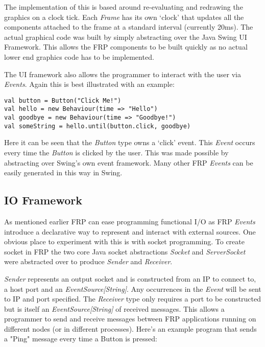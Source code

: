 \documentclass[12pt]{article}
\begin{document}
      The implementation of this is based around re-evaluating and redrawing the graphics on a clock tick. Each 
      \emph{Frame} has its own `clock' that updates all the components attached to the frame at a standard interval (currently 
      20ms). The actual graphical code was built by simply abstracting over the Java Swing UI Framework. This allows the FRP 
      components to be built quickly as no actual lower end graphics code has to be implemented.

      The UI framework also allows the programmer to interact with the user via \emph{Events}. Again this is best illustrated 
      with an example:

\begin{verbatim}
val button = Button("Click Me!") 
val hello = new Behaviour(time => "Hello")
val goodbye = new Behaviour(time => "Goodbye!")
val someString = hello.until(button.click, goodbye) 
\end{verbatim}

      Here it can be seen that the \emph{Button} type owns a `click' event. This \emph{Event} occurs every time the 
      \emph{Button} is clicked by the user. This was made possible by abstracting over Swing's own event framework. Many other 
      FRP \emph{Events} can be easily generated in this way in Swing.
    
    \subsection{IO Framework}
    
    As mentioned earlier FRP can ease programming functional I/O as FRP \emph{Events} introduce a declarative way to represent 
    and interact with external sources. One obvious place to experiment with this is with socket programming. To create socket 
    in FRP the two core Java socket abstractions \emph{Socket} and \emph{ServerSocket} were abstracted over to produce
    \emph{Sender} and \emph{Receiver}. 

    \emph{Sender} represents an output socket and is constructed from an IP to connect to, a host port and an 
    \emph{EventSource[String]}. Any occurrences in the \emph{Event} will be sent to IP and port specified. The \emph{Receiver} 
    type only requires a port to be constructed but is itself an \emph{EventSource[String]} of received messages. This allows 
    a programmer to send and receive messages between FRP applications running on different nodes (or in different processes).
    Here's an example program that sends a "Ping" message every time a Button is pressed:
\end{document}
